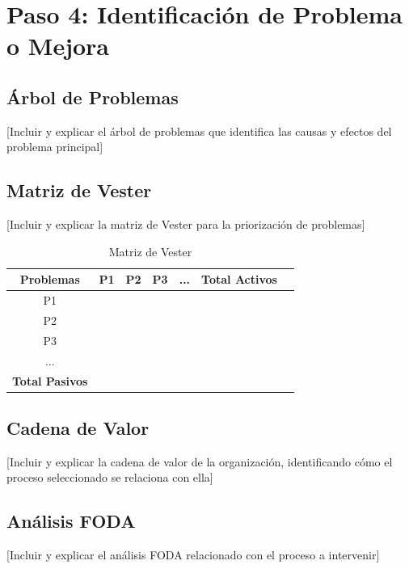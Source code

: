 \documentclass[12pt,letterpaper]{report}
\begin{document}
\section{Paso 4: Identificación de Problema o Mejora}

\subsection{Árbol de Problemas}
[Incluir y explicar el árbol de problemas que identifica las causas y efectos del problema principal]

\subsection{Matriz de Vester}
[Incluir y explicar la matriz de Vester para la priorización de problemas]

\begin{table}[H]
    \centering
    \begin{tabular}{|c|c|c|c|c|c|c|}
        \hline
        \textbf{Problemas} & \textbf{P1} & \textbf{P2} & \textbf{P3} & \textbf{...} & \textbf{Total Activos} \\
        \hline
        P1 & & & & & \\
        \hline
        P2 & & & & & \\
        \hline
        P3 & & & & & \\
        \hline
        ... & & & & & \\
        \hline
        \textbf{Total Pasivos} & & & & & \\
        \hline
    \end{tabular}
    \caption{Matriz de Vester}
\end{table}

\subsection{Cadena de Valor}
[Incluir y explicar la cadena de valor de la organización, identificando cómo el proceso seleccionado se relaciona con ella]

\subsection{Análisis FODA}
[Incluir y explicar el análisis FODA relacionado con el proceso a intervenir]
\end{document}
